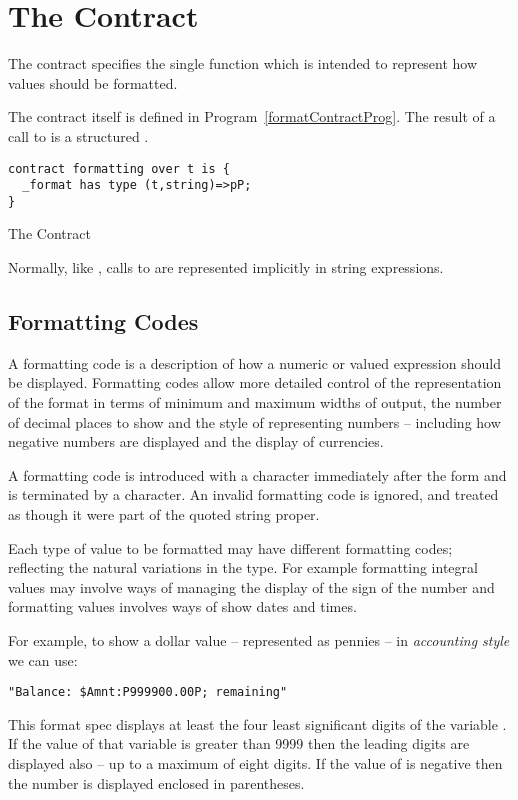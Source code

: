 \section{The  Contract}
\label{formatContract}
The  contract specifies the single  function which is intended to represent how values should be formatted.

The  contract itself is defined in Program~\vref{formatContractProg}. The result of a call to  is a structured .

\begin{program}
\begin{lstlisting}
contract formatting over t is {
  _format has type (t,string)=>pP;
}
\end{lstlisting}
\caption{The  Contract\label{formatContractProg}}
\end{program}



\begin{aside}
Normally, like , calls to  are represented implicitly in string  expressions.
\end{aside}
\subsection{Formatting Codes}
\label{formattingCodes}
A formatting code is a description of how a numeric or  valued expression should be displayed. Formatting codes allow more detailed control of the representation of the format in terms of minimum and maximum widths of output, the number of decimal places to show and the style of representing numbers -- including how negative numbers are displayed and the display of currencies.

A formatting code is introduced with a \q{:} character immediately after the \q{\$} form and is terminated by a \q{;} character. An invalid formatting code is ignored, and treated as though it were part of the quoted string proper.

Each type of value to be formatted may have different formatting codes; reflecting the natural variations in the type. For example formatting integral values may involve ways of managing the display of the sign of the number and formatting  values involves ways of show dates and times.

For example, to show a dollar value -- represented as pennies -- in \emph{accounting style} we can use:
\begin{lstlisting}
"Balance: $Amnt:P999900.00P; remaining"
\end{lstlisting}
This format spec displays at least the four least significant digits of the variable . If the value of that variable is greater than 9999 then the leading digits are displayed also -- up to a maximum of eight digits. If the value of  is negative then the number is displayed enclosed in parentheses.

